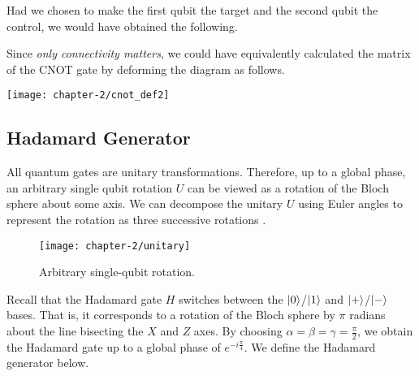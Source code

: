 Had we chosen to make the first qubit the target and the second qubit the control, we would have obtained the following.

Since \textit{only connectivity matters}, we could have equivalently calculated the matrix of the CNOT gate by deforming the diagram as follows.

\begin{center}
    \texttt{[image: chapter-2/cnot\_def2]}
\end{center}

\subsection{Hadamard Generator}

All quantum gates are unitary transformations. Therefore, up to a global phase, an arbitrary single qubit rotation $U$ can be viewed as a rotation of the Bloch sphere about some axis. We can decompose the unitary $U$ using Euler angles to represent the rotation as three successive rotations \cite{Wetering2020}.
\begin{figure}[H]
    \centering
    \texttt{[image: chapter-2/unitary]}
    \caption{Arbitrary single-qubit rotation.}
\end{figure}

Recall that the Hadamard gate $H$ switches between the $\ket 0$/$\ket 1$ and $\ket +$/$\ket -$ bases. That is, it corresponds to a rotation of the Bloch sphere by $\pi$ radians about the line bisecting the $X$ and $Z$ axes. By choosing $\alpha = \beta = \gamma = \frac{\pi}{2}$, we obtain the Hadamard gate up to a global phase of $e^{-i\frac{\pi}{4}}$. We define the Hadamard generator below.

